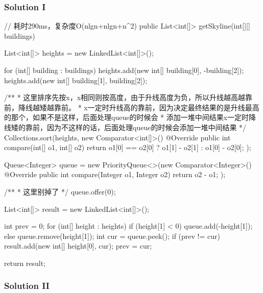 \newpage

\subsubsection{Solution I}

\begin{Code}
// 耗时290ms，复杂度O(nlgn+nlgn+n^2)
public List<int[]> getSkyline(int[][] buildings) {
    List<int[]> heights = new LinkedList<int[]>();

    for (int[] building : buildings) {
        heights.add(new int[] {building[0], -building[2]});
        heights.add(new int[] {building[1], building[2]});
    }

    /**
     * 这里排序先按x，x相同则按高度，由于升线高度为负，所以升线越高越靠前，降线越矮越靠前。
     * x一定时升线高的靠前，因为决定最终结果的是升线最高的那个，如果不是这样，后面处理queue的时候会
     * 添加一堆中间结果x一定时降线矮的靠前，因为不这样的话，后面处理queue的时候会添加一堆中间结果
     */
    Collections.sort(heights, new Comparator<int[]>() {
        @Override
        public int compare(int[] o1, int[] o2) {
            return o1[0] == o2[0] ? o1[1] - o2[1] : o1[0] - o2[0];
        }
    });

    Queue<Integer> queue = new PriorityQueue<>(new Comparator<Integer>() {
        @Override
        public int compare(Integer o1, Integer o2) {
            return o2 - o1;
        }
    });

    /**
     * 这里别掉了
     */
    queue.offer(0);

    List<int[]> result = new LinkedList<int[]>();

    int prev = 0;
    for (int[] height : heights) {
        if (height[1] < 0) {
            queue.add(-height[1]);
        } else {
            queue.remove(height[1]);
        }
        int cur = queue.peek();
        if (prev != cur) {
            result.add(new int[] {height[0], cur});
            prev = cur;
        }
    }

    return result;
}
\end{Code}

\newpage

\subsubsection{Solution II}

